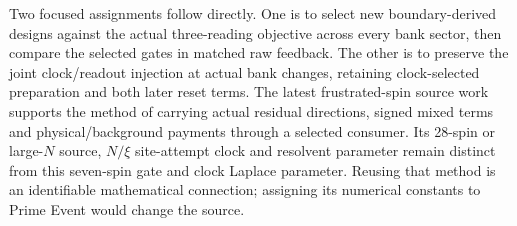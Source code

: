 Two focused assignments follow directly. One is to select new boundary-derived designs against the actual three-reading objective across every bank sector, then compare the selected gates in matched raw feedback. The other is to preserve the joint clock/readout injection at actual bank changes, retaining clock-selected preparation and both later reset terms. The latest frustrated-spin source work supports the method of carrying actual residual directions, signed mixed terms and physical/background payments through a selected consumer. Its 28-spin or large-$N$ source, $N/\xi$ site-attempt clock and resolvent parameter remain distinct from this seven-spin gate and clock Laplace parameter. Reusing that method is an identifiable mathematical connection; assigning its numerical constants to Prime Event would change the source.
